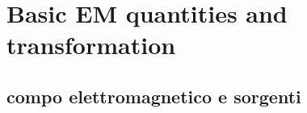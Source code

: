 \documentclass[main.tex]{subfile}
\begin{document}
\chapter{Basic EM quantities and transformation}

\section{compo elettromagnetico e sorgenti}
\end{document}
